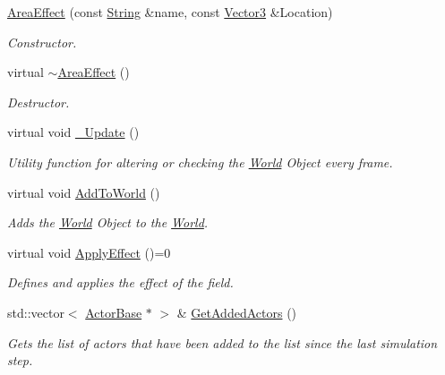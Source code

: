 \begin{DoxyCompactItemize}
\item 
\hyperlink{classMezzanine_1_1AreaEffect_a7422b18aa40ba0d9373b1e25e278205b}{Area\-Effect} (const \hyperlink{namespaceMezzanine_acf9fcc130e6ebf08e3d8491aebcf1c86}{String} \&name, const \hyperlink{classMezzanine_1_1Vector3}{Vector3} \&Location)
\begin{DoxyCompactList}\small\item\em Constructor. \end{DoxyCompactList}\item 
virtual \hyperlink{classMezzanine_1_1AreaEffect_a1e825ce1dcb2d78c190b17d7bff7306c}{$\sim$\-Area\-Effect} ()
\begin{DoxyCompactList}\small\item\em Destructor. \end{DoxyCompactList}\item 
virtual void \hyperlink{classMezzanine_1_1AreaEffect_aa852e811bf900d209be137901f7e536c}{\-\_\-\-Update} ()
\begin{DoxyCompactList}\small\item\em Utility function for altering or checking the \hyperlink{classMezzanine_1_1World}{World} Object every frame.  \end{DoxyCompactList}\item 
virtual void \hyperlink{classMezzanine_1_1AreaEffect_aed1323d5e951b5c02c789b4d30d6d9d7}{Add\-To\-World} ()
\begin{DoxyCompactList}\small\item\em Adds the \hyperlink{classMezzanine_1_1World}{World} Object to the \hyperlink{classMezzanine_1_1World}{World}.  \end{DoxyCompactList}\item 
virtual void \hyperlink{classMezzanine_1_1AreaEffect_a988cd958e49d65331a059951af3c2884}{Apply\-Effect} ()=0
\begin{DoxyCompactList}\small\item\em Defines and applies the effect of the field. \end{DoxyCompactList}\item 
std\-::vector$<$ \hyperlink{classMezzanine_1_1ActorBase}{Actor\-Base} $\ast$ $>$ \& \hyperlink{classMezzanine_1_1AreaEffect_ac349f091e923cbb92740aaa35f2f5c2e}{Get\-Added\-Actors} ()
\begin{DoxyCompactList}\small\item\em Gets the list of actors that have been added to the list since the last simulation step. \end{DoxyCompactList}\item 

\end{DoxyCompactItemize}
